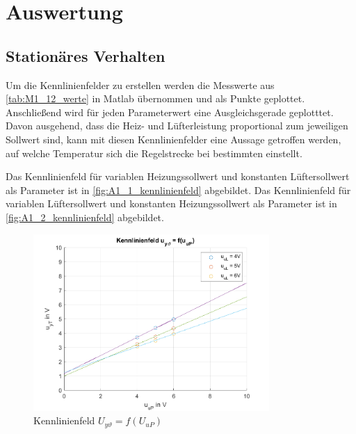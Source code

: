 \section{Auswertung}

\subsection{Stationäres Verhalten}

Um die Kennlinienfelder zu erstellen werden die Messwerte aus \autoref{tab:M1_12_werte} in Matlab übernommen und als Punkte geplottet. Anschließend wird für jeden Parameterwert eine Ausgleichsgerade geplotttet. Davon ausgehend, dass die Heiz- und Lüfterleistung proportional zum jeweiligen Sollwert sind, kann mit diesen Kennlinienfelder eine Aussage getroffen werden, auf welche Temperatur sich die Regelstrecke bei bestimmten einstellt.

Das Kennlinienfeld für variablen Heizungssollwert und konstanten Lüftersollwert als Parameter ist in \autoref{fig:A1_1_kennlinienfeld} abgebildet. Das Kennlinienfeld für variablen Lüftersollwert und konstanten Heizungssollwert als Parameter ist in \autoref{fig:A1_2_kennlinienfeld} abgebildet.

\begin{figure}[h]
    \begin{center}
        \includegraphics[width=0.8\textwidth]{img/A1_1.png}
        \caption{Kennlinienfeld \( U_{y\vartheta} = f\left(U_{uP}\right) \)}
        \label{fig:A1_1_kennlinienfeld}
    \end{center}
\end{figure}

\newpage

